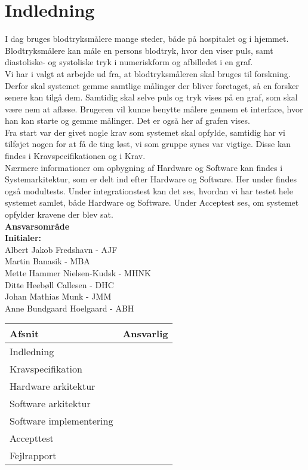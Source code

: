 \chapter{Indledning}
I dag bruges blodtryksmålere mange steder, både på hospitalet og i hjemmet. Blodtryksmålere kan måle en persons blodtryk, hvor den viser puls, samt diastoliske- og systoliske tryk i numeriskform og afbilledet i en graf.\\ 
Vi har i valgt at arbejde ud fra, at blodtryksmåleren skal bruges til forskning. Derfor skal systemet gemme samtlige målinger der bliver foretaget, så en forsker senere kan tilgå dem. Samtidig skal selve puls og tryk vises på en graf, som skal være nem at aflæse. Brugeren vil kunne benytte målere gennem et interface, hvor han kan starte og gemme målinger. Det er også her af grafen vises. \\
Fra start var der givet nogle krav som systemet skal opfylde, samtidig har vi tilføjet nogen for at få de ting løst, vi som gruppe synes var vigtige. Disse kan findes i Kravspecifikationen og i Krav.\\
Nærmere informationer om opbygning af Hardware og Software kan findes i Systemarkitektur, som er delt ind efter Hardware og Software. Her under findes også modultests. 
Under integrationstest kan det ses, hvordan vi har testet hele systemet samlet, både Hardware og Software. Under Acceptest ses, om systemet opfylder kravene der blev sat.\\ 


\textbf{Ansvarsområde} \\
\textbf{Initialer: } \\
Albert Jakob Fredshavn - AJF \\
Martin Banasik - MBA \\
Mette Hammer Nielsen-Kudsk - MHNK \\
Ditte Heebøll Callesen - DHC \\
Johan Mathias Munk - JMM \\
Anne Bundgaard Hoelgaard - ABH \\


\begin{longtabu} to 
    Afsnit &    Ansvarlig\\[-1ex]
    \midrule
    Indledning & \\
    Kravspecifikation & \\
    Hardware arkitektur & \\
    Software arkitektur & \\
    Software implementering & \\
    Accepttest & \\
    Fejlrapport & \\
    
    
    

\end{longtabu}